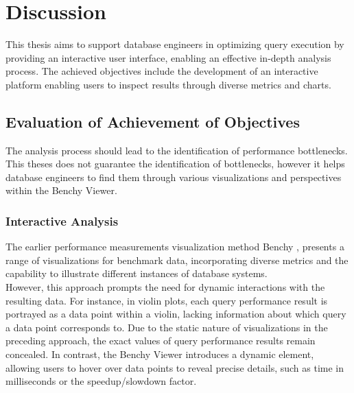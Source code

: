 
\chapter{Discussion}\label{chapter:discussion}

This thesis aims to support database engineers in optimizing query execution by providing an interactive user interface, enabling an effective in-depth analysis process. The achieved objectives include the development of an interactive platform enabling users to inspect results through diverse metrics and charts. 

\section{Evaluation of Achievement of Objectives}

The analysis process should lead to the identification of performance bottlenecks.
This theses does not guarantee the identification of bottlenecks, however it helps database engineers to find them through various visualizations and perspectives within the Benchy Viewer.


\subsection{Interactive Analysis}
The earlier performance measurements visualization method Benchy \parencite*{benchy},  presents a range of visualizations for benchmark data, incorporating diverse metrics and the capability to illustrate different instances of database systems.\\
However, this approach prompts the need for dynamic interactions with the resulting data. For instance, in violin plots, each query performance result is portrayed as a data point within a violin, lacking information about which query a data point corresponds to. Due to the static nature of visualizations in the preceding approach, the exact values of query performance results remain concealed. In contrast, the Benchy Viewer introduces a dynamic element, allowing users to hover over data points to reveal precise details, such as time in milliseconds or the speedup/slowdown factor.


